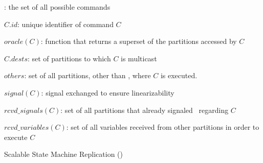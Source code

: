 \begin{algorithm}[t!]
\begin{distribalgo}[1]
\kk: the set of all possible commands

\vspace{1mm}

$C.id$: unique identifier of command $C$

\vspace{1mm}

$oracle(C)$: function that returns a superset of the partitions accessed by $C$

\vspace{1mm}

$C.dests$: set of partitions to which $C$ is multicast

\vspace{1mm}

$others$: set of all partitions, other than \pp{}, where $C$ is executed.

\vspace{1mm}

$signal(C)$: signal exchanged to ensure linearizability

\vspace{1mm}

$rcvd\_signals(C)$: set of all partitions that already signaled \pp\ regarding $C$

\vspace{1mm}

$rcvd\_variables(C)$: set of all variables received from other partitions in order to execute $C$

\caption{Scalable State Machine Replication (\ssmr)}
\label{alg:ssmr}
\end{distribalgo}
\end{algorithm}